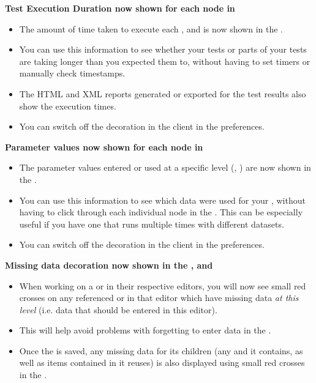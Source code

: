 \textbf{Test Execution Duration now shown for each node in \gdtestresultview{}}\\
\begin{itemize}
\item The amount of time taken to execute each \gdstep{}, \gdcase{} and \gdsuite{} is now shown in the \gdtestresultview{}.
\item You can use this information to see whether your tests or parts of your tests are taking longer than you expected them to, 
without having to set timers or manually check timestamps.
\item The HTML and XML reports generated or exported for the test results also show the execution times.
\item You can switch off the decoration in the \app{} client in the  preferences.
\end{itemize} 

\textbf{Parameter values now shown for each node in \gdtestresultview{}}\\
\begin{itemize}
\item The parameter values entered or used at a specific level (\gdcase{}, \gdstep{}) are now shown in the \gdtestresultview{}.
\item You can use this information to see which data were used for your \gdcases{}, without having to click through each individual node in the \gdtestresultview{}. This can be especially useful if you have one \gdcase{} that runs multiple times with different datasets.
\item You can switch off the decoration in the \app{} client in the  preferences.
\end{itemize} 

\textbf{Missing data decoration now shown in the \gdtestcaseeditor{}, \gdtestsuiteeditor{} and \gdtestcasebrowser{}}
\begin{itemize}
\item When working on a \gdcase{} or \gdsuite{} in their respective editors, you will now see small red crosses on any referenced \gdcases{} or \gdsteps{} in that editor which have missing data \textit{at this level} (i.e. data that should be entered in this editor). 
\item This will help avoid problems with forgetting to enter data in the \gdpropview{}. 
\item Once the \gdcase{} is saved, any missing data for its children (any \gdcases{} and \gdsteps{} it contains, as well as items contained in \gdcases{} it reuses) is also displayed using small red crosses in the \gdtestcasebrowser{}. 
\end{itemize}

